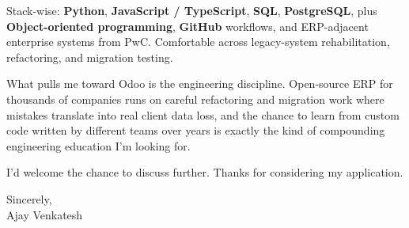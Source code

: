 \documentclass[letterpaper,11pt]{article}
\begin{document}
Stack-wise: \textbf{Python}, \textbf{JavaScript / TypeScript}, \textbf{SQL}, \textbf{PostgreSQL}, plus \textbf{Object-oriented programming}, \textbf{GitHub} workflows, and ERP-adjacent enterprise systems from PwC. Comfortable across legacy-system rehabilitation, refactoring, and migration testing.

What pulls me toward Odoo is the engineering discipline. Open-source ERP for thousands of companies runs on careful refactoring and migration work where mistakes translate into real client data loss, and the chance to learn from custom code written by different teams over years is exactly the kind of compounding engineering education I'm looking for.

I'd welcome the chance to discuss further. Thanks for considering my application.

\vspace{12pt}
Sincerely, \\
Ajay Venkatesh
\end{document}
